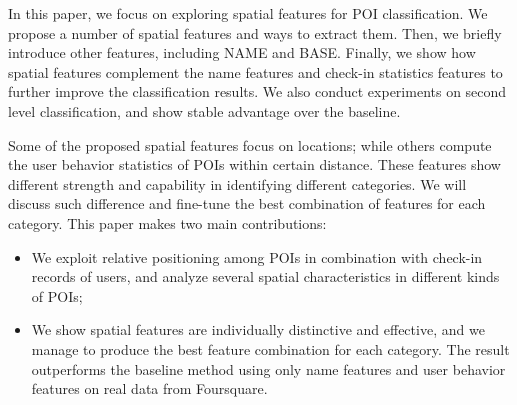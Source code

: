 In this paper, we focus on exploring spatial features for POI classification.
We propose a number of spatial features and ways to extract them.
Then, we briefly introduce other features,
including NAME and BASE.
Finally, we show how spatial features complement
the name features and check-in statistics features
to further improve the classification results.
We also conduct experiments on second level classification,
and show stable advantage over the baseline.

Some of the proposed spatial features focus on locations;
while others compute the user behavior statistics of
POIs within certain distance.
These features show different strength and capability in identifying
different categories. We will discuss such difference and fine-tune
the best combination of features for each category.
This paper makes two main contributions:
\begin{itemize}
\item We exploit relative positioning among POIs in combination
with check-in records of users, and
analyze several spatial characteristics in different kinds of POIs;
\item We show spatial features are individually distinctive and effective,
and we manage to produce the best feature combination for each category.
The result outperforms the baseline method using only name features and
user behavior features on real data from Foursquare.
\end{itemize}


